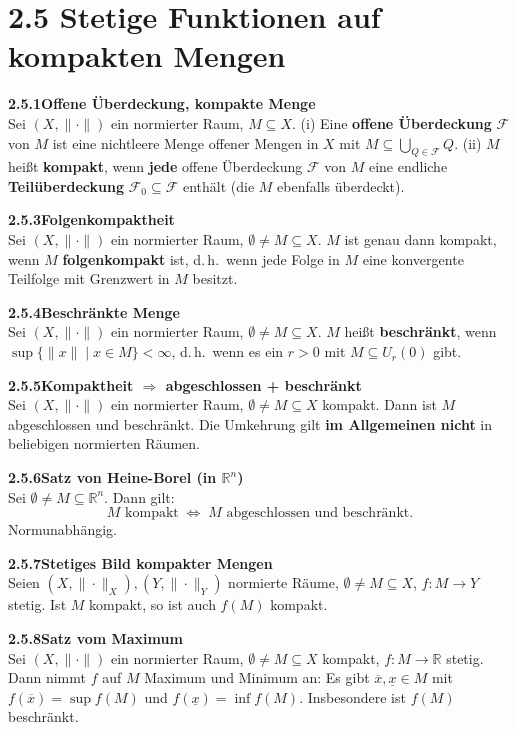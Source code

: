 \documentclass[a4paper,12pt]{article}
\newcommand{\gentry}[3]{%
  \noindent\textbf{#1\quad #2}\nopagebreak\\[0.2em]
  #3\par\smallskip
}
\begin{document}
\section*{2.5 \quad Stetige Funktionen auf kompakten Mengen}

\gentry{2.5.1}{Offene Überdeckung, kompakte Menge}{%
  Sei $(X, \|\cdot\|)$ ein normierter Raum, $M \subseteq X$.
  (i) Eine \textbf{offene Überdeckung} $\mathcal{F}$ von $M$ ist eine nichtleere
  Menge offener Mengen in $X$ mit $M \subseteq \bigcup_{Q \in \mathcal{F}} Q$.
  (ii) $M$ heißt \textbf{kompakt}, wenn \textbf{jede} offene Überdeckung $\mathcal{F}$
  von $M$ eine endliche \textbf{Teilüberdeckung} $\mathcal{F}_0 \subseteq \mathcal{F}$
  enthält (die $M$ ebenfalls überdeckt).
}

\gentry{2.5.3}{Folgenkompaktheit}{%
  Sei $(X, \|\cdot\|)$ ein normierter Raum, $\emptyset \neq M \subseteq X$.
  $M$ ist genau dann kompakt, wenn $M$ \textbf{folgenkompakt} ist, d.\,h.\ wenn
  jede Folge in $M$ eine konvergente Teilfolge mit Grenzwert in $M$ besitzt.
}

\gentry{2.5.4}{Beschränkte Menge}{%
  Sei $(X, \|\cdot\|)$ ein normierter Raum, $\emptyset \neq M \subseteq X$.
  $M$ heißt \textbf{beschränkt}, wenn $\sup\{\|x\| \mid x \in M\} < \infty$,
  d.\,h.\ wenn es ein $r > 0$ mit $M \subseteq U_r(0)$ gibt.
}

\gentry{2.5.5}{Kompaktheit $\Rightarrow$ abgeschlossen + beschränkt}{%
  Sei $(X, \|\cdot\|)$ ein normierter Raum, $\emptyset \neq M \subseteq X$
  kompakt. Dann ist $M$ abgeschlossen und beschränkt. Die Umkehrung gilt
  \textbf{im Allgemeinen nicht} in beliebigen normierten Räumen.
}

\gentry{2.5.6}{Satz von Heine-Borel (in $\mathbb{R}^n$)}{%
  Sei $\emptyset \neq M \subseteq \mathbb{R}^n$. Dann gilt:
  \[
    M \text{ kompakt} \;\Longleftrightarrow\; M \text{ abgeschlossen und beschränkt}.
  \]
  Normunabhängig.
}

\gentry{2.5.7}{Stetiges Bild kompakter Mengen}{%
  Seien $(X, \|\cdot\|_X), (Y, \|\cdot\|_Y)$ normierte Räume,
  $\emptyset \neq M \subseteq X$, $f: M \to Y$ stetig. Ist $M$ kompakt, so ist
  auch $f(M)$ kompakt.
}

\gentry{2.5.8}{Satz vom Maximum}{%
  Sei $(X, \|\cdot\|)$ ein normierter Raum, $\emptyset \neq M \subseteq X$
  kompakt, $f: M \to \mathbb{R}$ stetig. Dann nimmt $f$ auf $M$ Maximum und
  Minimum an: Es gibt $\overline{x}, \underline{x} \in M$ mit
  $f(\overline{x}) = \sup f(M)$ und $f(\underline{x}) = \inf f(M)$.
  Insbesondere ist $f(M)$ beschränkt.
}
\end{document}
